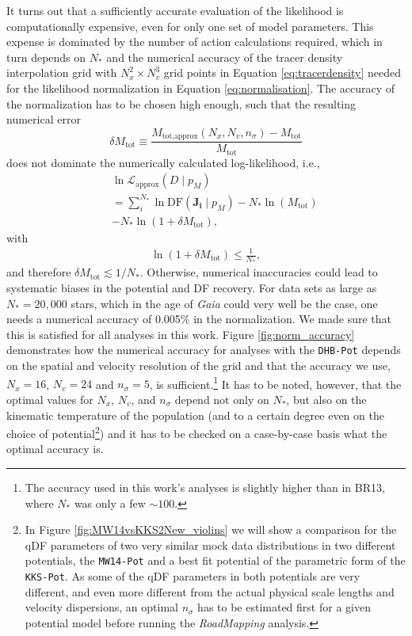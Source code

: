 \documentclass[iop,revtex4,numberedappendix,appendixfloats]{emulateapj}
\newcommand{\vect}[1]{\boldsymbol{#1}}
\newcommand{\pmodel}{\ensuremath{p_M}}
\newcommand{\RM}{{\sl RoadMapping}}
\begin{document}
It turns out that a sufficiently accurate evaluation of the likelihood is computationally expensive, even for only one set of model parameters. This expense is dominated by the number of action calculations required, which in turn depends on $N_*$ and the numerical accuracy of the tracer density interpolation grid with $N_x^2 \times N_v^3$ grid points in Equation \eqref{eq:tracerdensity} needed for the likelihood normalization in Equation \eqref{eq:normalisation}. The accuracy of the normalization has to be chosen high enough, such that the resulting numerical error 
\begin{equation}
\delta M_\text{tot} \equiv \frac{M_\text{tot,approx}(N_x,N_v,n_\sigma) - M_\text{tot} }{M_\text{tot}}\label{eq:relerrlikelihood}
\end{equation}
does not dominate the numerically calculated log-likelihood, i.e.,
\begin{eqnarray}
& & \ln \mathscr{L}_\text{approx}(D \mid \pmodel) \nonumber\\
&& = \sum_i^{N_*} \ln \text{DF}(\vect{J_i} \mid \pmodel) - N_* \ln(M_\text{tot})\nonumber\\
&& - N_* \ln (1 + \delta M_\text{tot}),\label{eq:loglikelihood_relerr}
\end{eqnarray}
with
\begin{eqnarray}
\ln (1 + \delta M_\text{tot}) \leq \frac{1}{N_{*}},\label{eq:accuracycondition}
\end{eqnarray}
and therefore $\delta M_\text{tot} \lesssim 1/N_*$. Otherwise, numerical inaccuracies could lead to systematic biases in the potential and DF recovery. For data sets as large as $N_* = 20,000$ stars, which in the age of \emph{Gaia} could very well be the case, one needs a numerical accuracy of 0.005\% in the normalization. We made sure that this is satisfied for all analyses in this work. Figure \ref{fig:norm_accuracy} demonstrates how the numerical accuracy for analyses with the \texttt{DHB-Pot} depends on the spatial and velocity resolution of the grid and that the accuracy we use, $N_x=16$, $N_v=24$ and $n_\sigma=5$, is sufficient.\footnote{The accuracy used in this work's analyses is slightly higher than in BR13, where $N_*$ was only a few $\sim 100$.} It has to be noted, however, that the optimal values for $N_x$, $N_v$, and $n_\sigma$ depend not only on $N_*$, but also on the kinematic temperature of the population (and to a certain degree even on the choice of potential\footnote{In Figure \ref{fig:MW14vsKKS2New_violins} we will show a comparison for the qDF parameters of two very similar mock data distributions in two different potentials, the \texttt{MW14-Pot} and a best fit potential of the parametric form of the \texttt{KKS-Pot}. As some of the qDF parameters in both potentials are very different, and even more different from the actual physical scale lengths and velocity dispersions, an optimal $n_\sigma$ has to be estimated first for a given potential model before running the \RM{} analysis.}) and it has to be checked on a case-by-case basis what the optimal accuracy is. 
\end{document}
